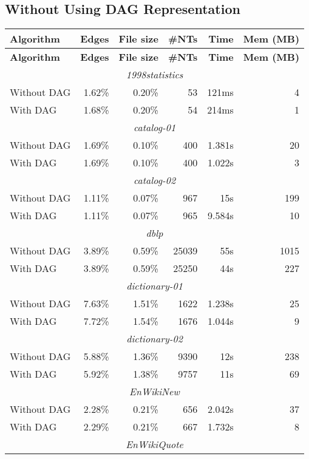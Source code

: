 \documentclass[12pt]{llncs}
\begin{document}
\newpage

\subsection{Without Using DAG Representation}\label{sec:detailedResultsNoDag}

\begin{longtable}{lrrrrr}
			\toprule
\textbf{Algorithm}&\textbf{Edges}&\textbf{File size}&\textbf{\#NTs}&\textbf{Time}&\textbf{Mem (MB)}\\\midrule
\endhead
			\toprule
\textbf{Algorithm}&\textbf{Edges}&\textbf{File size}&\textbf{\#NTs}&\textbf{Time}&\textbf{Mem (MB)}\\
\endfirsthead
			\midrule\multicolumn{6}{c}{\emph{1998statistics}}\\*
			Without DAG&1.62\%&0.20\%&53&121ms&4\\*
			With DAG&1.68\%&0.20\%&54&214ms&1\\
			\midrule\multicolumn{6}{c}{\emph{catalog-01}}\\*
			Without DAG&1.69\%&0.10\%&400&1.381s&20\\*
			With DAG&1.69\%&0.10\%&400&1.022s&3\\
			\midrule\multicolumn{6}{c}{\emph{catalog-02}}\\*
			Without DAG&1.11\%&0.07\%&967&15s&199\\*
			With DAG&1.11\%&0.07\%&965&9.584s&10\\
			\midrule\multicolumn{6}{c}{\emph{dblp}}\\*
			Without DAG&3.89\%&0.59\%&25039&55s&1015\\*
			With DAG&3.89\%&0.59\%&25250&44s&227\\
			\midrule\multicolumn{6}{c}{\emph{dictionary-01}}\\*
			Without DAG&7.63\%&1.51\%&1622&1.238s&25\\*
			With DAG&7.72\%&1.54\%&1676&1.044s&9\\
			\midrule\multicolumn{6}{c}{\emph{dictionary-02}}\\*
			Without DAG&5.88\%&1.36\%&9390&12s&238\\*
			With DAG&5.92\%&1.38\%&9757&11s&69\\
			\midrule\multicolumn{6}{c}{\emph{EnWikiNew}}\\*
			Without DAG&2.28\%&0.21\%&656&2.042s&37\\*
			With DAG&2.29\%&0.21\%&667&1.732s&8\\
			\midrule\multicolumn{6}{c}{\emph{EnWikiQuote}}\\*

\end{longtable}
\end{document}
